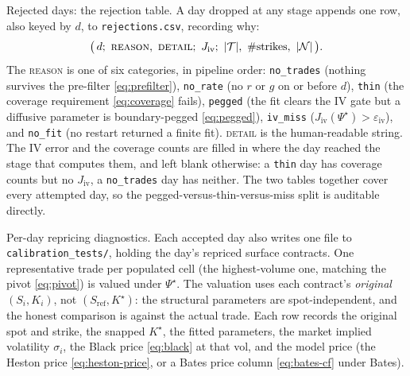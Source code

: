 \documentclass[a4paper, 11pt, reqno]{amsart}
\makeatletter
\def\paragraph{\@startsection{paragraph}{4}%
	\z@\z@{-\fontdimen2\font}%
	{\normalfont\bfseries}}
\newcommand{\ConstIvGateSym}{\varepsilon_{\mathrm{iv}}}  \newcommand{\ConstIvGateVal}{0.02}
\makeatother
\begin{document}
		\paragraph{Rejected days: the rejection table.} A day dropped at any stage appends one row, also keyed
		by $d$, to \texttt{rejections.csv}, recording why:
		\begin{equation}\label{eq:rejection-row}
			\bigl(\,d;\ \textsc{reason},\ \textsc{detail};\ J_{\mathrm{iv}};\ |\mathcal{T}|,\ \#\text{strikes},\ |\mathcal{N}|\,\bigr).
		\end{equation}
		The \textsc{reason} is one of six categories, in pipeline order: \texttt{no\_trades} (nothing
		survives the pre-filter \eqref{eq:prefilter}), \texttt{no\_rate} (no $r$ or $g$ on or before $d$),
		\texttt{thin} (the coverage requirement \eqref{eq:coverage} fails), \texttt{pegged} (the fit clears
		the IV gate but a diffusive parameter is boundary-pegged \eqref{eq:pegged}), \texttt{iv\_miss}
		($J_{\mathrm{iv}}(\Psi^\star) > \ConstIvGateSym$), and \texttt{no\_fit} (no restart returned a finite
		fit). \textsc{detail} is the human-readable string. The IV error and the coverage counts are filled
		in where the day reached the stage that computes them, and left blank otherwise: a \texttt{thin} day
		has coverage counts but no $J_{\mathrm{iv}}$, a \texttt{no\_trades} day has neither. The two tables
		together cover every attempted day, so the pegged-versus-thin-versus-miss split is auditable
		directly.
		
		\paragraph{Per-day repricing diagnostics.} Each accepted day also writes one file to
		\texttt{calibration\_tests/}, holding the day's repriced surface contracts. One representative trade
		per populated cell (the highest-volume one, matching the pivot \eqref{eq:pivot}) is valued under
		$\Psi^\star$. The valuation uses each contract's \emph{original} $(S_i,K_i)$, not
		$(S_{\mathrm{ref}},K^\star)$: the structural parameters are spot-independent, and the honest
		comparison is against the actual trade. Each row records the original spot and strike, the snapped
		$K^\star$, the fitted parameters, the market implied volatility $\sigma_i$, the Black price
		\eqref{eq:black} at that vol, and the model price (the Heston price \eqref{eq:heston-price}, or a
		Bates price column \eqref{eq:bates-cf} under Bates).
		
\end{document}
